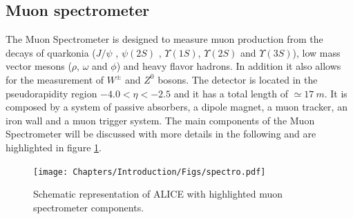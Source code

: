 \subsection{Muon spectrometer}
\label{ALICE_spectrometer}
The Muon Spectrometer is designed to measure muon production from the decays of quarkonia ($J/\psi$ , $\psi(2S)$ , $\Upsilon(1S)$, $\Upsilon(2S)$ and $\Upsilon(3S)$), low mass vector mesons ($\rho$, $\omega$ and $\phi$) and heavy flavor hadrons.
In addition it also allows for the measurement of $W^\pm$ and $Z^0$ bosons. 
The detector is located in the pseudorapidity region $-4.0 < \eta < -2.5$ and it has a total length of $\simeq 17\ m$. 
It is composed by a system of passive absorbers, a dipole magnet, a muon tracker, an iron wall and a muon trigger system. 
The main components of the Muon Spectrometer will be discussed with more details in the following and are highlighted in figure \ref{fig:spectro}.

\begin{figure}[!h]
\begin{center}
\texttt{[image: Chapters/Introduction/Figs/spectro.pdf]}
\caption{Schematic representation of ALICE with highlighted muon spectrometer components.}
\label{fig:spectro}
\end{center}
\end{figure}

